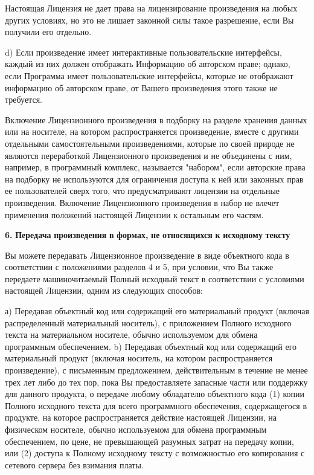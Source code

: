 Настоящая Лицензия не дает права на лицензирование произведения на любых других условиях, но это не лишает законной силы такое разрешение, если Вы получили его отдельно.

d) Если произведение имеет интерактивные пользовательские интерфейсы, каждый из них должен отображать Информацию об авторском праве; однако, если Программа имеет пользовательские интерфейсы, которые не отображают информацию об авторском праве, от Вашего произведения этого также не требуется.

Включение Лицензионного произведения в подборку на разделе хранения данных или на носителе, на котором распространяется произведение, вместе с другими отдельными самостоятельными произведениями, которые по своей природе не являются переработкой Лицензионного произведения и не объединены с ним, например, в программный комплекс, называется "{}набором"{}, если авторские права на подборку не используются для ограничения доступа к ней или законных прав ее пользователей сверх того, что предусматривают лицензии на отдельные произведения. Включение Лицензионного произведения в набор не влечет применения положений настоящей Лицензии к остальным его частям.

{\bfseries{6.}} {\bfseries{Передача}} {\bfseries{произведения}} {\bfseries{в}} {\bfseries{формах,}} {\bfseries{не}} {\bfseries{относящихся}} {\bfseries{к}} {\bfseries{исходному}} {\bfseries{тексту}}

Вы можете передавать Лицензионное произведение в виде объектного кода в соответствии с положениями разделов 4 и 5, при условии, что Вы также передаете машиночитаемый Полный исходный текст в соответствии с условиями настоящей Лицензии, одним из следующих способов\+:

а) Передавая объектный код или содержащий его материальный продукт (включая распределенный материальный носитель), с приложением Полного исходного текста на материальном носителе, обычно используемом для обмена программным обеспечением. b) Передавая объектный код или содержащий его материальный продукт (включая носитель, на котором распространяется произведение), с письменным предложением, действительным в течение не менее трех лет либо до тех пор, пока Вы предоставляете запасные части или поддержку для данного продукта, о передаче любому обладателю объектного кода (1) копии Полного исходного текста для всего программного обеспечения, содержащегося в продукте, на которое распространяется действие настоящей Лицензии, на физическом носителе, обычно используемом для обмена программным обеспечением, по цене, не превышающей разумных затрат на передачу копии, или (2) доступа к Полному исходному тексту с возможностью его копирования с сетевого сервера без взимания платы.

